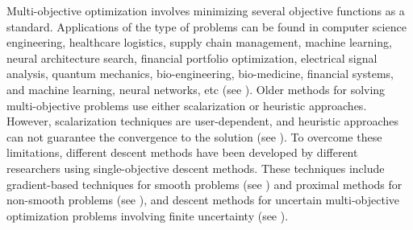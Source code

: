\documentclass[smallextended,referee,envcountsect]{svjour3}
\begin{document}
\par Multi-objective optimization involves minimizing several objective functions as a standard. Applications of the type of problems can be found in computer science engineering, healthcare logistics, supply chain management, machine learning, neural architecture search, financial portfolio optimization, electrical signal analysis, quantum mechanics, bio-engineering, bio-medicine, financial systems, and machine learning, neural networks, etc (see \cite{45,46,44,43}). Older methods for solving multi-objective problems use either scalarization or heuristic approaches. However, scalarization techniques are user-dependent, and heuristic approaches can not guarantee the convergence to the solution (see \cite{50}). To overcome these limitations, different descent methods have been developed by different researchers using single-objective descent methods. These techniques include gradient-based techniques for smooth problems (see \cite{sir1,67,66,JOTA2,60,13,25}) and proximal methods for non-smooth problems (see \cite{30,61,JOTA1,64}), and descent methods for uncertain multi-objective optimization problems involving finite uncertainty (see \cite{kumar1,kumar2,kumar3}).
\end{document}
